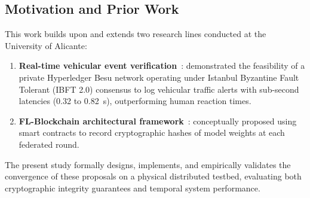 \subsection{Motivation and Prior Work}
This work builds upon and extends two research lines conducted at the University of Alicante:
\begin{enumerate}
    \item \textbf{Real-time vehicular event verification}~\cite{pujol2024blockchain}: demonstrated the feasibility of a private Hyperledger Besu network operating under Istanbul Byzantine Fault Tolerant (IBFT 2.0) consensus to log vehicular traffic alerts with sub-second latencies (0.32 to 0.82~s), outperforming human reaction times.
    \item \textbf{FL-Blockchain architectural framework}~\cite{cloudlabaia_flblockchain}: conceptually proposed using smart contracts to record cryptographic hashes of model weights at each federated round.
\end{enumerate}

The present study formally designs, implements, and empirically validates the convergence of these proposals on a physical distributed testbed, evaluating both cryptographic integrity guarantees and temporal system performance.

